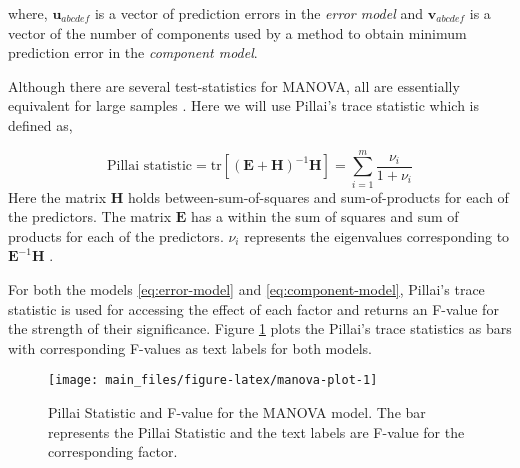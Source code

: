 \documentclass[review]{elsarticle}
\begin{document}
where, \(\mathbf{u}_{abcdef}\) is a vector of prediction errors in the \emph{error model} and \(\mathbf{v}_{abcdef}\) is a vector of the number of components used by a method to obtain minimum prediction error in the \emph{component model}.

Although there are several test-statistics for MANOVA, all are essentially equivalent for large samples \citep{johnson2018applied}. Here we will use Pillai's trace statistic which is defined as,

\begin{equation}
\text{Pillai statistic} = \text{tr}\left[
\left(\mathbf{E} + \mathbf{H}\right)^{-1}\mathbf{H}
\right] = \sum_{i=1}^m{\frac{\nu_i}{1 + \nu_i}}
\label{eq:pillai}
\end{equation}
Here the matrix \(\mathbf{H}\) holds between-sum-of-squares and sum-of-products for each of the predictors. The matrix \(\mathbf{E}\) has a within the sum of squares and sum of products for each of the predictors. \(\nu_i\) represents the eigenvalues corresponding to \(\mathbf{E}^{-1}\mathbf{H}\) \citep{rencher2003methods}.

For both the models \eqref{eq:error-model} and \eqref{eq:component-model}, Pillai's trace statistic is used for accessing the effect of each factor and returns an F-value for the strength of their significance. Figure \ref{fig:manova-plot} plots the Pillai's trace statistics as bars with corresponding F-values as text labels for both models.



\begin{figure}
\texttt{[image: main\_files/figure-latex/manova-plot-1]} \caption{Pillai Statistic and F-value for the MANOVA model. The bar represents the Pillai Statistic and the text labels are F-value for the corresponding factor.}\label{fig:manova-plot}
\end{figure}
\end{document}
